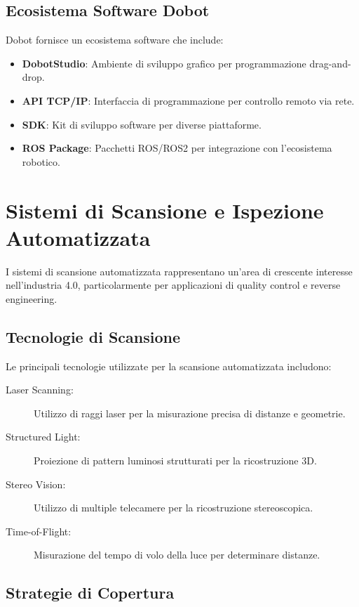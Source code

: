 \documentclass[12pt,a4paper,twoside,openright]{book}
\begin{document}
\subsection{Ecosistema Software Dobot}

Dobot fornisce un ecosistema software che include:

\begin{itemize}
    \item \textbf{DobotStudio}: Ambiente di sviluppo grafico per programmazione drag-and-drop.
    \item \textbf{API TCP/IP}: Interfaccia di programmazione per controllo remoto via rete.
    \item \textbf{SDK}: Kit di sviluppo software per diverse piattaforme.
    \item \textbf{ROS Package}: Pacchetti ROS/ROS2 per integrazione con l'ecosistema robotico.
\end{itemize}

\section{Sistemi di Scansione e Ispezione Automatizzata}

I sistemi di scansione automatizzata rappresentano un'area di crescente interesse nell'industria 4.0, particolarmente per applicazioni di quality control e reverse engineering.

\subsection{Tecnologie di Scansione}

Le principali tecnologie utilizzate per la scansione automatizzata includono:

\begin{description}
    \item[Laser Scanning:] Utilizzo di raggi laser per la misurazione precisa di distanze e geometrie.
    \item[Structured Light:] Proiezione di pattern luminosi strutturati per la ricostruzione 3D.
    \item[Stereo Vision:] Utilizzo di multiple telecamere per la ricostruzione stereoscopica.
    \item[Time-of-Flight:] Misurazione del tempo di volo della luce per determinare distanze.
\end{description}

\subsection{Strategie di Copertura}
\end{document}
